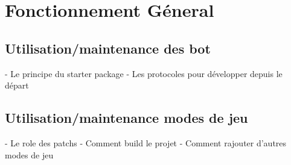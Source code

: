 \chapter{Fonctionnement Géneral} 

\section{Utilisation/maintenance des bot}
	- Le principe du starter package 
	- Les protocoles pour développer depuis le départ

\section{Utilisation/maintenance modes de jeu}
	- Le role des patchs
	- Comment build le projet
	- Comment rajouter d'autres modes de jeu
